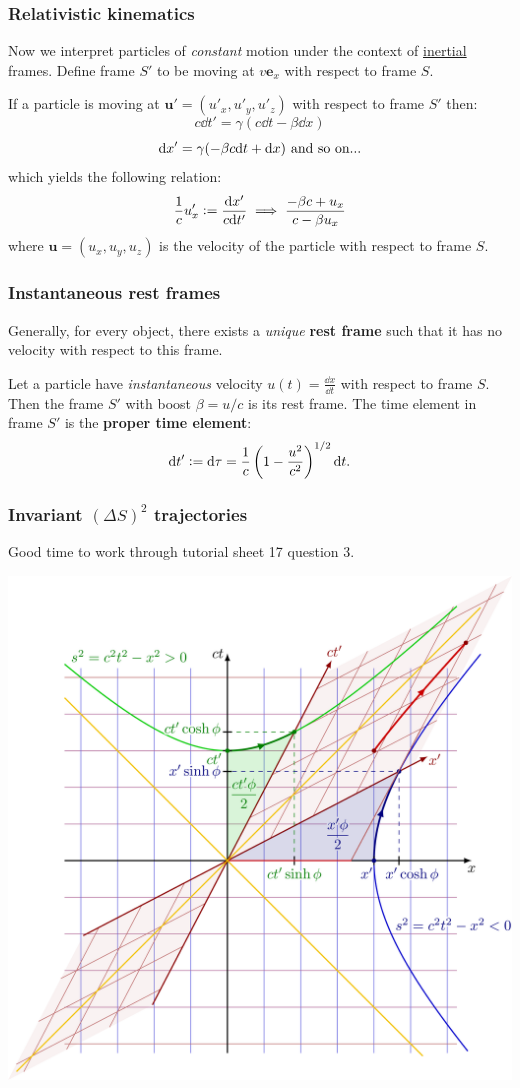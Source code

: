 \documentclass{article}
\newcommand{\deq}{\vcentcolon=}
\newcommand{\vc}[1]{\boldsymbol{#1}}
\begin{document}
\begin{multicols*}{3}
\subsubsection*{Relativistic kinematics}
Now we interpret particles of \textit{constant} motion
under the context of \underline{inertial} frames.
Define frame $S'$ to be moving at $v\vc{e}_x$ with respect to frame $S$.

If a particle is moving at $\vc{u}'=(u'_x,u'_y,u'_z)$
with respect to frame $S'$ then:
$$c\dd t'=\gamma(c\dd t-\beta \dd x)$$
$$\dd x'=\gamma(-\beta c\dd t+\dd x)
\hspace{0.05in}\text{and so on...}$$
which yields the following relation:
$$\frac{1}{c}u'_x\deq\frac{\dd x'}{c\dd t'}
\implies\frac{-\beta c+u_x}{c-\beta u_x}$$
where $\vc{u}=(u_x,u_y,u_z)$ is the velocity of the particle
with respect to frame $S$.

\subsubsection*{Instantaneous rest frames}
Generally, for every object, there exists a \textit{unique}
\textbf{rest frame} such that it has no velocity
with respect to this frame.

Let a particle have \textit{instantaneous} velocity
$u(t)=\frac{\dd x}{\dd t}$ with respect to frame $S$.
Then the frame $S'$ with boost $\beta=u/c$ is its rest frame.
The time element in frame $S'$ is the \textbf{proper time element}:
$$\dd t'\deq \dd\tau=\frac{1}{c}\left(1-\frac{u^2}{c^2}\right)^{1/2}\dd t.$$

\subsubsection*{Invariant $(\Delta S)^2$ trajectories}
Good time to work through tutorial sheet 17 question 3.
\begin{center}
    \includegraphics[scale=0.08]{f13.png}
\end{center}


\end{multicols*}
\end{document}

